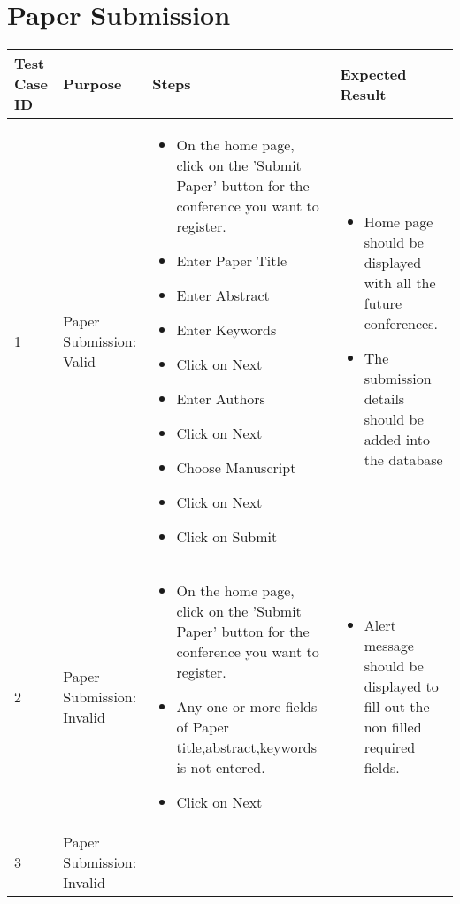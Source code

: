 \documentclass[english,a4paper,12pt]{report}
\begin{document}
\section{Paper Submission}
\begin{longtable} { | p{2cm} | p{3cm}| p{6cm}| p{6cm} |} 
\hline 
\textbf{Test Case ID} & \textbf{Purpose}  & \textbf{Steps} &\textbf{Expected Result} \\
\hline 1 &  Paper Submission: Valid &  
\vspace{-5mm}
\begin{itemize}
\item On the home page, click on the 'Submit Paper' button for the conference you want to register.
\item Enter Paper Title
\item Enter Abstract
\item Enter Keywords
\item Click on Next
\item Enter Authors
\item Click on Next
\item Choose Manuscript
\item Click on Next
\item Click on Submit
\end{itemize}&
\vspace{-5mm}
\begin{itemize}
\item Home page should be displayed with all the future conferences.
\item The submission details should be added into the database
\end{itemize}\\
\hline 2 &  Paper Submission: Invalid &  
\vspace{-5mm}
\begin{itemize}
\item On the home page, click on the 'Submit Paper' button for the conference you want to register.
\item Any one or more fields of Paper title,abstract,keywords is not entered.
\item Click on Next
\end{itemize}&
\vspace{-5mm}
\begin{itemize}
\item Alert message should be displayed to fill out the non filled required fields.
\end{itemize}\\
\hline 3 &  Paper Submission: Invalid &  

\end{longtable}
\end{document}
